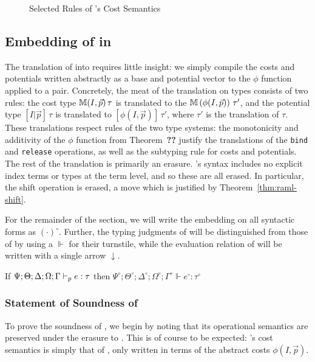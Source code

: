 \begin{figure}
\label{fig:selected-sem-rules}

\caption{Selected Rules of \dlambdaamor's Cost Semantics}
\end{figure}

\subsection{Embedding of \dlambdaamor in \lambdaamor}
The translation of \dlambdaamor into \lambdaamor requires little insight: we simply compile the costs and potentials written abstractly as a base and potential vector to the $\phi$ function applied to a pair. Concretely, the meat of the translation on types consists of two rules: the \dlambdaamor cost type $\mathbb{M}(I,\vec{p}) \, \tau$ is translated to the \lambdaamor $\mathbb{M} \left(\phi(I,\vec{p})\right)\, \tau'$, and the potential type $[I|\vec{p}] \, \tau$ is translated to $\left[\phi(I,\vec{p})\right] \, \tau'$, where $\tau'$ is the translation of $\tau$. These translations respect rules of the two type systems: the monotonicity and additivity of the $\phi$ function from Theorem~\textbf{??} justify the translations of the \texttt{bind} and \texttt{release} operations, as well as the subtyping rule for costs and potentials. The rest of the translation is primarily an erasure. \lambdaamor's syntax includes no explicit index terms or types at the term level, and so these are all erased. In particular, the shift operation is erased, a move which is justified by Theorem~\ref{thm:raml-shift}.

For the remainder of the section, we will write the embedding on all syntactic forms as $(\cdot)^\circ$. Further, the typing judgments of \lambdaamor will be distinguished from those of \dlambdaamor by using a $\Vdash$ for their turnstile, while the evaluation relation of \lambdaamor will be written with a single arrow $\downarrow$.

\begin{theorem}
\label{thm:dla-trans-sound}
If $\Psi ; \Theta ; \Delta ; \Omega ; \Gamma \vdash_p e : \tau$ then $\Psi^\circ ; \Theta^\circ ; \Delta^\circ ; \Omega^\circ ; \Gamma^\circ \Vdash e^\circ : \tau^\circ$
\end{theorem}


\subsubsection{Statement of Soundness of \dlambdaamor}
To prove the soundness of \dlambdaamor, we begin by noting that its operational semantics are preserved under the erasure to \lambdaamor. This is of course to be expected: \dlambdaamor's cost semantics is simply that of \lambdaamor, only written in terms of the abstract costs $\phi(I,\vec{p})$.

